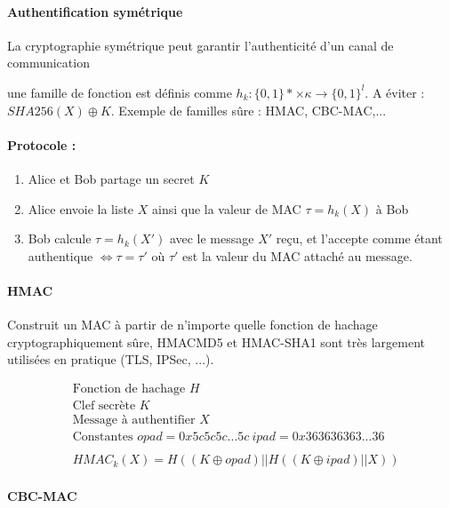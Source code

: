 \documentclass[11pt,a4paper]{report}
\begin{document}
\paragraph*{Authentification symétrique}

La cryptographie symétrique peut garantir l’authenticité d’un canal de communication

une famille de fonction est définis comme $h_k:\{0,1\}* \times \kappa \longrightarrow \{0,1\}^l$. A éviter : $SHA256(X) \oplus K$. Exemple de familles sûre : HMAC, CBC-MAC,...

\paragraph*{Protocole : }
\begin{enumerate}
    \item Alice et Bob partage un secret $K$
    \item Alice envoie la liste $X$ ainsi que la valeur de MAC $\tau = h_k(X)$ à Bob
    \item Bob calcule $\tau = h_k(X')$ avec le message $X'$ reçu, et l'accepte comme étant authentique $\Longleftrightarrow \tau = \tau'$ où $\tau'$ est la valeur du MAC attaché au message.
\end{enumerate}

\paragraph*{HMAC}

Construit un MAC à partir de n’importe quelle fonction de hachage cryptographiquement sûre, HMAC\-MD5 et HMAC-SHA1 sont très largement utilisées en pratique (TLS, IPSec, ...).

\begin{align*}
& \text{Fonction de hachage } H \\
& \text{Clef secrète } K \\
& \text{Message à authentifier } X \\
& \text{Constantes } opad = 0x5c5c5c...5c \ ipad = 0x363636363...36 \\
& \\
& HMAC_k(X) = H((K\oplus opad)||H((K\oplus ipad)||X))
\end{align*}

\paragraph*{CBC-MAC}
\end{document}
